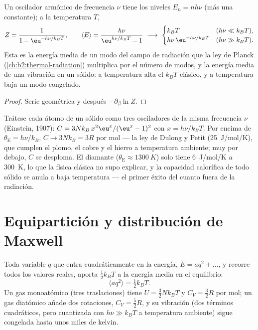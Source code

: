 \begin{proposition}\label{prop:b2:boltzmann-factor:oscillator}
Un oscilador armónico de frecuencia $\nu$ tiene los niveles $E_n = nh\nu$ (más
una constante); a la temperatura $T$,
\[
Z = \frac{1}{1 - \eu^{-h\nu/k_BT}}, \qquad
\langle E\rangle = \frac{h\nu}{\eu^{h\nu/k_BT} - 1}
\ \longrightarrow\
\begin{cases} k_BT & (h\nu \ll k_BT), \\ h\nu\,\eu^{-h\nu/k_BT} & (h\nu \gg k_BT). \end{cases}
\]
Esta es la energía media de un modo del campo de radiación que la ley de
Planck (\cref{ch:b2:thermal-radiation}) multiplica por el número de modos,
y la energía media de una vibración en un sólido: a temperatura alta el
$k_BT$ clásico, y a temperatura baja un modo congelado.
\end{proposition}

\begin{proof}
Serie geométrica y después $-\partial_\beta\ln Z$.
\end{proof}

\begin{example}\label{ex:b2:boltzmann-factor:einstein}
Trátese cada átomo de un sólido como tres osciladores de la misma frecuencia
$\nu$ (Einstein, 1907): $C = 3Nk_B\,x^2\eu^x/(\eu^x - 1)^2$ con $x =
h\nu/k_BT$. Por encima de $\theta_{\text{E}} = h\nu/k_B$, $C \to 3Nk_B = 3R$ por mol
--- la ley de Dulong y Petit (\qty{25}{J/mol/K}), que cumplen el plomo,
el cobre y el hierro a temperatura ambiente; muy por debajo, $C$ se desploma. El diamante
($\theta_{\text{E}} \approx \qty{1300}{K}$) solo tiene \qty{6}{J/mol/K} a
\qty{300}{K}, lo que la física clásica no supo explicar, y la capacidad calorífica de todo sólido
se anula a baja temperatura --- el primer éxito del
cuanto fuera de la radiación.
\end{example}

\section{Equipartición y distribución de Maxwell}

\begin{theorem}\label{thm:b2:boltzmann-factor:equipartition}
Toda variable $q$ que entra cuadráticamente en la energía, $E = aq^2 +
\dots$, y recorre todos los valores reales, aporta $\tfrac12k_BT$ a
la energía media en el equilibrio:
\[
\langle aq^2\rangle = \tfrac12k_BT .
\]
Un gas monoatómico (tres traslaciones) tiene $U = \tfrac32Nk_BT$ y $C_V =
\tfrac32R$ por mol; un gas diatómico añade dos rotaciones, $C_V = \tfrac52R$,
y su vibración (dos términos cuadráticos, pero cuantizada con $h\nu \gg
k_BT$ a temperatura ambiente) sigue congelada hasta unos miles de kelvin.
\end{theorem}


